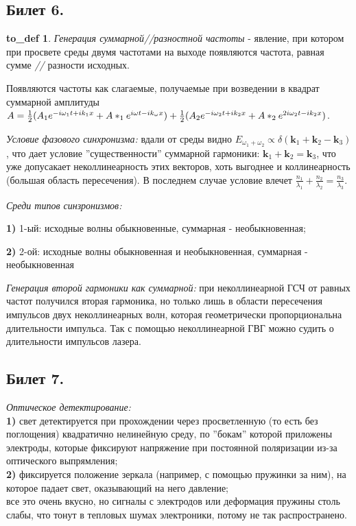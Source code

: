 \documentclass[a4paper,12pt]{article}
\theoremstyle{definition} %
\theoremstyle{definition} %
\newtheorem{to_def}{to_def}[section]
\theoremstyle{remark} %
\begin{document}
\subsection{Билет 6.}

\begin{to_def}
	\textit{Генерация суммарной//разностной частоты} - явление, при котором при просвете среды двумя частотами на выходе появляются частота, равная сумме \textit{//} разности исходных.
\end{to_def}

Появляются частоты как слагаемые, получаемые при возведении в квадрат суммарной амплитуды $A = \frac{1}{2} (A_{1}e^{-i\omega_{1} t +i k_{1}x} + A*_{1}e^{i\omega t -i k_{\omega}x}) + \\ \frac{1}{2} (A_{2}e^{-i\omega_{2} t +i k_{2}x} + A*_{2}e^{2i\omega_{2} t -i k_{2}x})$.


\textit{Условие фазового синхронизма:} вдали от среды видно $E_{\omega_{1}+\omega_{2}} \propto \delta(\mathbf{k}_{1}+\mathbf{k}_{2}-\mathbf{k}_{3})$, что дает условие ''существенности'' суммарной гармоники: $\mathbf{k}_{1}+\mathbf{k}_{2}=\mathbf{k}_{3}$, что уже допусакает неколлинеарность этих векторов, хоть выгоднее и коллинеарность (большая область пересечения). В последнем случае условие влечет $\frac{n_{1}}{\lambda_{1}}+\frac{n_{2}}{\lambda_{2}}=\frac{n_{3}}{\lambda_{3}}$.


\textit{Среди типов синзронизмов:} \\
	\par \textbf{1)} 1-ый: исходные волны обыкновенные, суммарная - необыкновенная;\\
	\par \textbf{2)} 2-ой: исходные волны обыкновенная и необыкновенная, суммарная - необыкновенная


\textit{Генерация второй гармоники как суммарной:} при неколлинеарной ГСЧ от равных частот получился вторая гармоника, но только лишь в области пересечения импульсов двух неколлинеарных волн, которая геометрически пропорциональна длительности импульса. Так с помощью неколлинеарной ГВГ можно судить о длительности импульсов лазера.


\subsection{Билет 7.}


\textit{Оптическое детектирование:} \\
	\textbf{1)} свет детектируется при прохождении через просветленную (то есть без поглощения) квадратично нелинейную среду, по ''бокам'' которой приложены электроды, которые фиксируют напряжение при постоянной поляризации из-за оптического выпрямления; \\
	\textbf{2)} фиксируется положение зеркала (например, с помощью пружинки за ним), на которое падает свет, оказывающий на него давление; \\
	все это очень вкусно, но сигналы с электродов или деформация пружины столь слабы, что тонут в тепловых шумах электроники, потому не так распространено.
\end{document}
